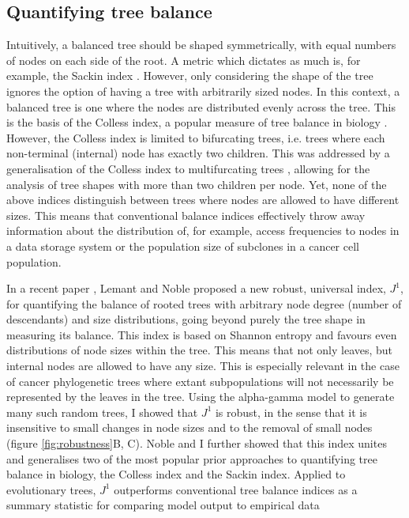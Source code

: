 \subsection{Quantifying tree balance}
Intuitively, a balanced tree should be shaped symmetrically, with equal numbers
of nodes on each side of the root. A metric which dictates as much is, for
example, the Sackin index \cite{sackin_good_1972}. However, only considering
the shape of the tree ignores the option of having a tree with arbitrarily
sized nodes. In this context, a balanced tree is one where the nodes are
distributed evenly across the tree. This is the basis of the Colless index, a
popular measure of tree balance in biology \cite{colless_review_1982}. However,
the Colless index is limited to bifurcating trees, i.e. trees where each
non-terminal (internal) node has exactly two children. This was addressed by a
generalisation of the Colless index to multifurcating trees
\cite{mir_sound_2018}, allowing for the analysis of tree shapes with more than
two children per node. Yet, none of the above indices distinguish between trees
where nodes are allowed to have different sizes. This means that conventional
balance indices effectively throw away information about the distribution of,
for example, access frequencies to nodes in a data storage system or the
population size of subclones in a cancer cell population. \par
In a recent paper \cite{lemant_robust_2022}, Lemant and Noble proposed a new
robust, universal index, $J^1$, for quantifying the balance of rooted trees
with arbitrary node degree (number of descendants) and size distributions,
going beyond purely the tree shape in measuring its balance. This index is
based on Shannon entropy and favours even distributions of node sizes within
the tree. This means that not only leaves, but internal nodes are allowed to
have any size. This is especially relevant in the case of cancer phylogenetic
trees where extant subpopulations will not necessarily be represented by the
leaves in the tree. Using the alpha-gamma model \cite{chen_new_2009} to
generate many such random trees, I showed that $J^1$ is robust, in the sense
that it is insensitive to small changes in node sizes and to the removal of
small nodes (figure \ref{fig:robustness}B, C). Noble and I further showed that
this index unites and generalises two of the most popular prior approaches to
quantifying tree balance in biology, the Colless index and the Sackin index.
Applied to evolutionary trees, $J^1$ outperforms conventional tree balance
indices as a summary statistic for comparing model output to empirical data
